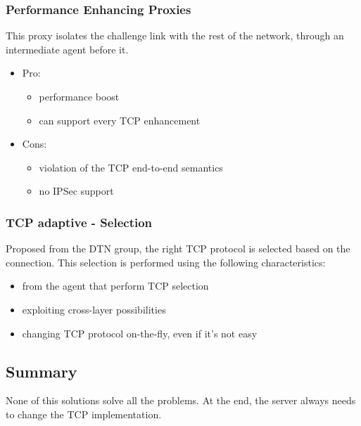 \subsubsection{Performance Enhancing Proxies}
This proxy isolates the challenge link with the rest of the network, through an
intermediate agent before it.
\begin{itemize}
  \item Pro:
    \begin{itemize}
    \item performance boost
    \item can support every TCP enhancement
    \end{itemize}
  \item Cons:
    \begin{itemize}
    \item violation of the TCP end-to-end semantics
    \item no IPSec support
    \end{itemize}
\end{itemize}

\subsubsection{TCP adaptive - Selection}
Proposed from the DTN group, the right TCP protocol is selected based on the
connection. This selection is performed using the following characteristics:
\begin{itemize}
\item from the agent that perform TCP selection
\item exploiting cross-layer possibilities
\item changing TCP protocol on-the-fly, even if it's not easy
\end{itemize}

\subsection{Summary}
None of this solutions solve all the problems. At the end, the server always
needs to change the TCP implementation.
